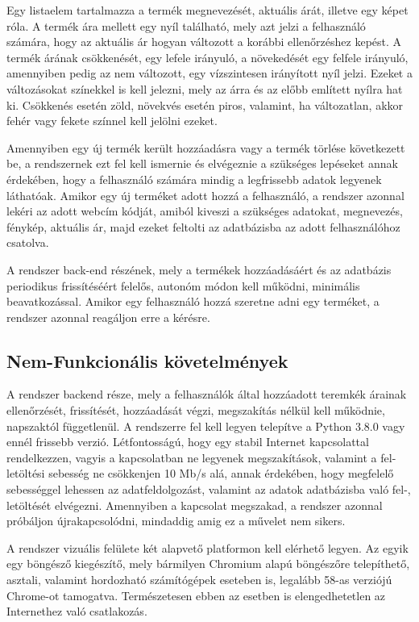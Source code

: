 Egy listaelem tartalmazza a termék megnevezését, aktuális árát, illetve egy képet róla. A termék ára mellett egy nyíl található, mely azt jelzi a felhasználó számára, hogy az aktuális ár hogyan változott a korábbi ellenőrzéshez kepést. A termék árának csökkenését, egy lefele irányuló, a növekedését egy felfele irányuló, amennyiben pedig az nem változott, egy vízszintesen irányított nyíl jelzi. Ezeket a változásokat színekkel is kell jelezni, mely az árra és az előbb említett nyílra hat ki. Csökkenés esetén zöld, növekvés esetén piros, valamint, ha változatlan, akkor fehér vagy fekete színnel kell jelölni ezeket.

Amennyiben egy új termék került hozzáadásra vagy a termék törlése következett be, a rendszernek ezt fel kell ismernie és elvégeznie a szükséges lepéseket annak érdekében, hogy a felhasználó számára mindig a legfrissebb adatok legyenek láthatóak. Amikor egy új terméket adott hozzá a felhasználó, a rendszer azonnal lekéri az adott webcím kódját, amiból kiveszi a szükséges adatokat, megnevezés, fénykép, aktuális ár, majd ezeket feltolti az adatbázisba az adott felhasználóhoz csatolva.

A rendszer back-end részének, mely a termékek hozzáadásáért és az adatbázis periodikus frissítéséért felelős, autonóm módon kell működni, minimális beavatkozással. Amikor egy felhasználó hozzá szeretne adni egy terméket, a rendszer azonnal reagáljon erre a kérésre.

\subsection{Nem-Funkcionális követelmények}

A rendszer backend része, mely a felhasználók által hozzáadott teremkék árainak ellenőrzését, frissítését, hozzáadását végzi, megszakítás nélkül kell működnie, napszaktól függetlenül. A rendszerre fel kell legyen telepítve a Python 3.8.0 vagy ennél frissebb verzió. Létfontosságú, hogy egy stabil Internet kapcsolattal rendelkezzen, vagyis a kapcsolatban ne legyenek megszakítások, valamint a fel-letöltési sebesség ne csökkenjen 10 Mb/s alá, annak érdekében, hogy megfelelő sebességgel lehessen az adatfeldolgozást, valamint az adatok adatbázisba való fel-, letöltését elvégezni. Amennyiben a kapcsolat megszakad, a rendszer azonnal próbáljon újrakapcsolódni, mindaddig amig ez a művelet nem sikers.

A rendszer vizuális felülete két alapvető platformon kell elérhető legyen. Az egyik egy böngésző kiegészítő, mely bármilyen Chromium alapú böngészőre telepíthető, asztali, valamint hordozható számítógépek eseteben is, legalább 58-as verziójú Chrome-ot tamogatva. Természetesen ebben az esetben is elengedhetetlen az Internethez való csatlakozás.

